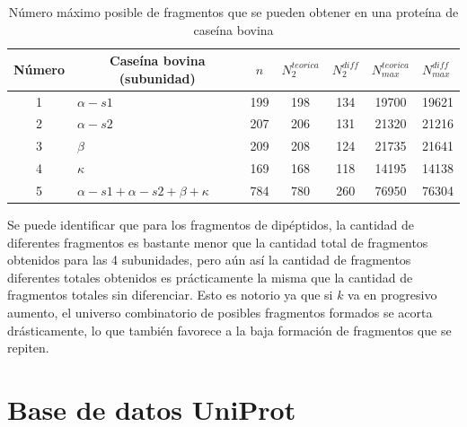 \begin{table}[H]
\centering
\label{my-label4}
\begin{tabular}{|c|l|c|c|c|c|c|}
\hline
Número & \multicolumn{1}{c|}{Caseína bovina (subunidad)} & $n$ & $N_{2}^{teorica}$ & \multicolumn{1}{l|}{$N_{2}^{diff}$} & \multicolumn{1}{l|}{$N_{max}^{teorica}$} & \multicolumn{1}{l|}{$N_{max}^{diff}$} \\ \hline
1      & $\alpha - s1$                                   & 199 & 198               & 134                                 & 19700                                     & 19621                                  \\
2      & $\alpha - s2$                                   & 207 & 206               & 131                                 & 21320                                     & 21216                                  \\
3      & $\beta$                                         & 209 & 208               & 124                                 & 21735                                     & 21641                                  \\
4      & $\kappa$                                        & 169 & 168               & 118                                 & 14195                                     & 14138                                  \\
5      & $\alpha - s1 + \alpha - s2 + \beta + \kappa$    & 784 & 780               & 260                                 & 76950                                     & 76304                                  \\ \hline
\end{tabular}
\caption{Número máximo posible de fragmentos que se pueden obtener en una proteína de caseína bovina}
\end{table}

Se puede identificar que para los fragmentos de dipéptidos, la cantidad de diferentes fragmentos es bastante menor que la cantidad total de fragmentos obtenidos para las 4 subunidades, pero aún así la cantidad de fragmentos diferentes totales obtenidos es prácticamente la misma que la cantidad de fragmentos totales sin diferenciar. Esto es notorio ya que si $k$ va en progresivo aumento, el universo combinatorio de posibles fragmentos formados se acorta drásticamente, lo que también favorece a la baja formación de fragmentos que se repiten.

\section{Base de datos UniProt}

